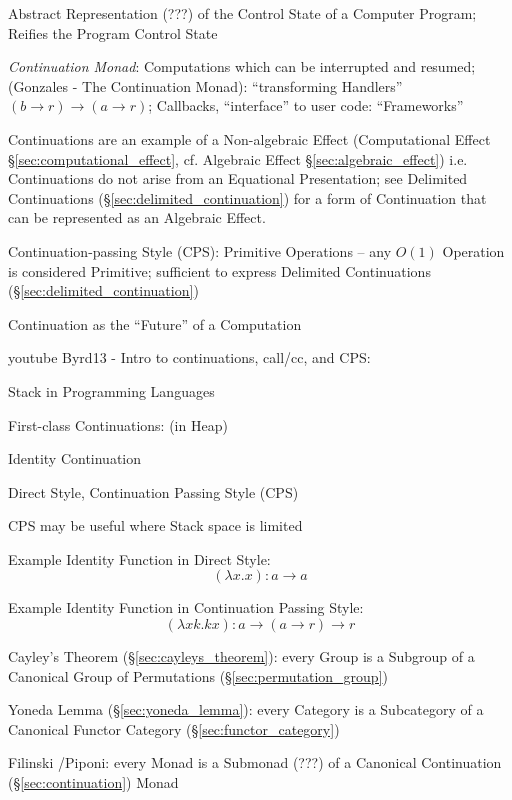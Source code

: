 Abstract Representation (???) of the Control State of a Computer
Program; Reifies the Program Control State

\emph{Continuation Monad}: Computations which can be interrupted and
resumed; (Gonzales - The Continuation Monad): ``transforming
Handlers'' $(b \rightarrow r) \rightarrow (a \rightarrow r)$;
Callbacks, ``interface'' to user code: ``Frameworks''

Continuations are an example of a Non-algebraic Effect (Computational
Effect \S\ref{sec:computational_effect}, cf. Algebraic Effect
\S\ref{sec:algebraic_effect}) i.e. Continuations do not arise from an
Equational Presentation; see Delimited Continuations
(\S\ref{sec:delimited_continuation}) for a form of Continuation that
can be represented as an Algebraic Effect.

Continuation-passing Style (CPS): Primitive Operations -- any $O(1)$
Operation is considered Primitive; sufficient to express Delimited
Continuations (\S\ref{sec:delimited_continuation})


Continuation as the ``Future'' of a Computation


\asterism


youtube Byrd13 - Intro to continuations, call/cc, and CPS:

Stack in Programming Languages

First-class Continuations: (in Heap) %

Identity Continuation


\asterism


Direct Style, Continuation Passing Style (CPS)

CPS may be useful where Stack space is limited

Example Identity Function in Direct Style:
\[
  (\lambda x . x) : a \rightarrow a
\]

Example Identity Function in Continuation Passing Style:
\[
  (\lambda x k.k x) : a \rightarrow (a \rightarrow r) \rightarrow r
\]

Cayley's Theorem (\S\ref{sec:cayleys_theorem}): every Group is a
Subgroup of a Canonical Group of Permutations
(\S\ref{sec:permutation_group})

Yoneda Lemma (\S\ref{sec:yoneda_lemma}): every Category is a
Subcategory of a Canonical Functor Category
(\S\ref{sec:functor_category})

Filinski \cite{filinski99}/Piponi: every Monad is a Submonad (???) of
a Canonical Continuation (\S\ref{sec:continuation}) Monad


